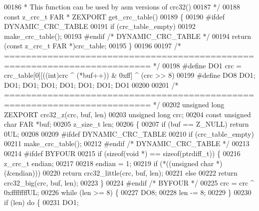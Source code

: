 \begin{DoxyCode}
{00186 \textcolor{comment}{ * This function can be used by asm versions of crc32()}
00187 \textcolor{comment}{ */}
00188 \textcolor{keyword}{const} z\_crc\_t FAR * ZEXPORT get\_crc\_table()
00189 \{
00190 \textcolor{preprocessor}{#ifdef DYNAMIC\_CRC\_TABLE}
00191     \textcolor{keywordflow}{if} (crc\_table\_empty)
00192         make\_crc\_table();
00193 \textcolor{preprocessor}{#endif }\textcolor{comment}{/* DYNAMIC\_CRC\_TABLE */}\textcolor{preprocessor}{}
00194     \textcolor{keywordflow}{return} (\textcolor{keyword}{const} z\_crc\_t FAR *)crc\_table;
00195 \}
00196 
00197 \textcolor{comment}{/* ========================================================================= */}
00198 \textcolor{preprocessor}{#define DO1 crc = crc\_table[0][((int)crc ^ (*buf++)) & 0xff] ^ (crc >> 8)}
00199 \textcolor{preprocessor}{#define DO8 DO1; DO1; DO1; DO1; DO1; DO1; DO1; DO1}
00200 
00201 \textcolor{comment}{/* ========================================================================= */}
00202 \textcolor{keywordtype}{unsigned} \textcolor{keywordtype}{long} ZEXPORT crc32\_z(crc, buf, len)
00203     \textcolor{keywordtype}{unsigned} \textcolor{keywordtype}{long} crc;
00204     \textcolor{keyword}{const} \textcolor{keywordtype}{unsigned} \textcolor{keywordtype}{char} FAR *buf;
00205     z\_size\_t len;
00206 \{
00207     \textcolor{keywordflow}{if} (buf == Z\_NULL) \textcolor{keywordflow}{return} 0UL;
00208 
00209 \textcolor{preprocessor}{#ifdef DYNAMIC\_CRC\_TABLE}
00210     \textcolor{keywordflow}{if} (crc\_table\_empty)
00211         make\_crc\_table();
00212 \textcolor{preprocessor}{#endif }\textcolor{comment}{/* DYNAMIC\_CRC\_TABLE */}\textcolor{preprocessor}{}
00213 
00214 \textcolor{preprocessor}{#ifdef BYFOUR}
00215     \textcolor{keywordflow}{if} (\textcolor{keyword}{sizeof}(\textcolor{keywordtype}{void} *) == \textcolor{keyword}{sizeof}(ptrdiff\_t)) \{
00216         z\_crc\_t endian;
00217 
00218         endian = 1;
00219         \textcolor{keywordflow}{if} (*((\textcolor{keywordtype}{unsigned} \textcolor{keywordtype}{char} *)(&endian)))
00220             \textcolor{keywordflow}{return} crc32\_little(crc, buf, len);
00221         \textcolor{keywordflow}{else}
00222             \textcolor{keywordflow}{return} crc32\_big(crc, buf, len);
00223     \}
00224 \textcolor{preprocessor}{#endif }\textcolor{comment}{/* BYFOUR */}\textcolor{preprocessor}{}
00225     crc = crc ^ 0xffffffffUL;
00226     \textcolor{keywordflow}{while} (len >= 8) \{
00227         DO8;
00228         len -= 8;
00229     \}
00230     \textcolor{keywordflow}{if} (len) \textcolor{keywordflow}{do} \{
00231         DO1;
}
\end{DoxyCode}
